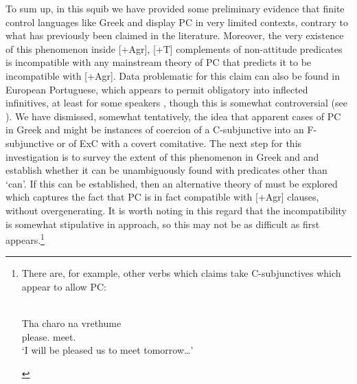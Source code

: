 \documentclass[output=paper]{langsci/langscibook}
\begin{document}
\largerpage[-2]
To sum up, in this squib we have provided some preliminary evidence that finite
control languages like Greek and  display \gls{PC} in very limited contexts, contrary to what has previously been claimed
in the literature. Moreover, the very existence of this phenomenon inside
[+Agr], [+T] complements of non-attitude predicates is incompatible with any
mainstream theory of \gls{PC} that predicts it to
be incompatible with [+Agr]. Data problematic for this claim can also be found
in European Portuguese, which appears to permit obligatory  into
inflected infinitives, at least for some speakers
\parencite{Sheehan2018a,Sheehan2018b},
though this is somewhat controversial (see \citealt{Barbosa2017}). We have
dismissed, somewhat tentatively, the idea that apparent cases of
\gls{PC} in Greek and  might be instances
of coercion of a C-subjunctive into an F-subjunctive or of
\gls{ExC} with a covert comitative. The next
step for this investigation is to survey the extent of this phenomenon in Greek
and  and establish whether it can be unambiguously found with
predicates other than ‘can’. If this can be established, then an alternative
theory of  must be explored which captures the fact that
\gls{PC} is in fact compatible with [+Agr] clauses,
without overgenerating. It is worth noting in this regard that the
incompatibility is somewhat stipulative in  approach, so
this may not be as difficult as first appears.\footnote{There are, for example,
    other verbs which \citeauthor{Varlokosta1994} claims take C-subjunctives
    which appear to allow \gls{PC}:

\begin{exe}
     \\
    \gll Tha charo     na   vrethume \\
    \Fut{} please.\Fsg{}   \Sbjv{} meet.\Fpl{}\\
    \glt ‘I will be pleased us to meet tomorrow\dots{}’
\end{exe}}

\printchapterglossary{}

{\sloppy
\printbibliography[heading=subbibliography,notkeyword=this]
}
\end{document}
